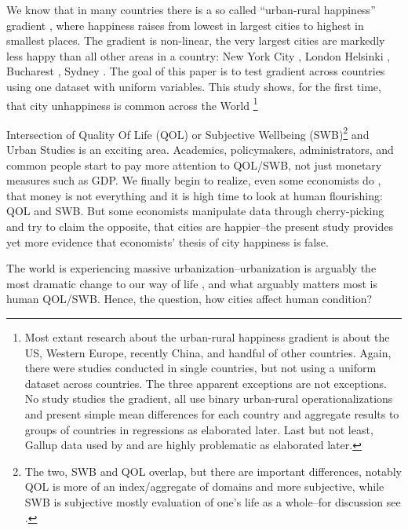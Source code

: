 \documentclass[10pt, letterpaper]{article}
\begin{document}
We know that in many countries there is a so called  ``urban-rural happiness''
gradient \cite{aok11a}, where happiness raises from lowest in largest cities to
highest in smallest places. The gradient is non-linear, the very largest cities
are markedly less happy than all other areas in a country: New York City \citep{aok_brfss_city_cize16,
  senior_ny_sep16_14}, London \citep{ons11,ibt13} Helsinki \citep{morrison15}, Bucharest \citep{lenzi16D}, Sydney
\citep[cited in][]{morrison11}.
The goal of this paper is to test gradient across countries using one dataset
with uniform variables. This study shows, for the first time, that city unhappiness is 
 common across the World \footnote{Most extant research about the urban-rural
   happiness gradient  is about
   the US, Western Europe, recently China, and handful of
other countries. Again, there were studies conducted in
   single countries, but not using a uniform dataset across countries. The three
   apparent exceptions \citep{aokcities,burger20,easterlin10al} are not
   exceptions. No study studies the gradient, all use binary urban-rural
   operationalizations and present simple mean differences for each country and
   aggregate results to groups of countries in regressions  as elaborated later.
Last but not least, Gallup data used by \citet{burger20} and
\citet{easterlin10al} are highly problematic as elaborated later.}
 
Intersection of %
Quality Of Life (QOL) or Subjective Wellbeing (SWB)\footnote{The two, SWB and
  QOL overlap, but there are important differences, notably QOL is more of an
  index/aggregate of domains and more subjective, while SWB is subjective mostly
evaluation of one's life as a whole--for discussion see \citet{aok-swbLivability18}.}  and Urban Studies is an exciting area.
Academics, policymakers, administrators, and common people start to pay more
attention to QOL/SWB, not just monetary measures such as GDP. We finally begin to realize, even some economists do
\citep{stiglitz09al}, that money is not everything and it is high time to look at human
flourishing: QOL and SWB. 
%
 But some economists
manipulate data through cherry-picking \citep{glaeser11,glaeser14,burger20} and
try to claim the opposite, that cities are happier--the present study provides
yet more evidence that economists' thesis of city happiness is false.
 
The world is experiencing massive
urbanization--urbanization is arguably the most dramatic change to our way of life \cite{wirth38,hansonCityJournalautumn15}, and what arguably matters most
is human QOL/SWB. Hence, the question, how cities affect human condition? 
\end{document}
